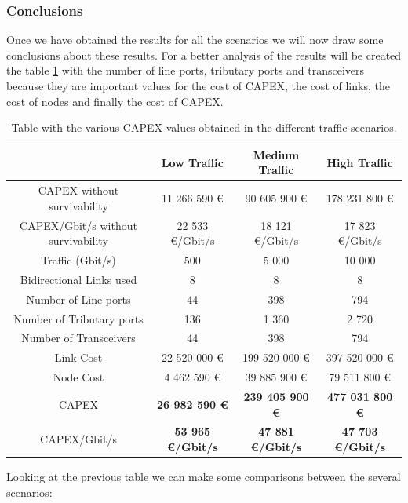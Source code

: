 \vspace{15pt}
\subsubsection{Conclusions}

Once we have obtained the results for all the scenarios we will now draw some conclusions about these results. For a better analysis of the results will be created the table \ref{table_comparative_opaque_protec} with the number of line ports, tributary ports and transceivers because they are important values for the cost of CAPEX, the cost of links, the cost of nodes and finally the cost of CAPEX.\\

\begin{table}[h!]
\centering
\begin{tabular}{| c | c | c | c |}
 \hline
  & Low Traffic & Medium Traffic  & High Traffic \\
 \hline\hline
 CAPEX without survivability&11 266 590 \euro&90 605 900 \euro&178 231 800 \euro\\ \hline
 CAPEX/Gbit/s without survivability&22 533 \euro/Gbit/s&18 121 \euro/Gbit/s&17 823 \euro/Gbit/s\\ \hline
 Traffic (Gbit/s) & 500 & 5 000 & 10 000 \\ \hline
 Bidirectional Links used & 8 & 8 & 8 \\ \hline
 Number of Line ports & 44 & 398 & 794 \\ \hline
 Number of Tributary ports & 136 & 1 360 & 2 720 \\ \hline
 Number of Transceivers & 44 & 398 & 794 \\ \hline
 Link Cost & 22 520 000 \euro & 199 520 000 \euro & 397 520 000 \euro \\ \hline
 Node Cost & 4 462 590 \euro & 39 885 900 \euro & 79 511 800 \euro \\ \hline
 CAPEX & \textbf{26 982 590 \euro} & \textbf{239 405 900 \euro} & \textbf{477 031 800 \euro} \\ \hline
 CAPEX/Gbit/s & \textbf{53 965 \euro/Gbit/s} & \textbf{47 881 \euro/Gbit/s} & \textbf{47 703 \euro/Gbit/s}\\
 \hline
\end{tabular}
\caption{Table with the various CAPEX values obtained in the different traffic scenarios.}
\label{table_comparative_opaque_protec}
\end{table}


Looking at the previous table we can make some comparisons between the several scenarios:

